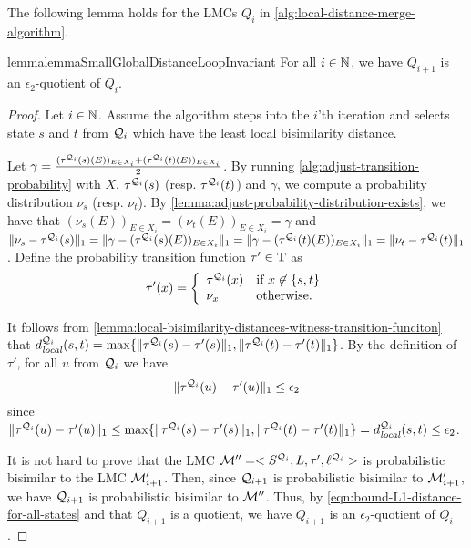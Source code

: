 The following lemma holds for the LMCs $Q_i$ in \cref{alg:local-distance-merge-algorithm}.
\begin{restatable}{lemma}{lemmaSmallGlobalDistanceLoopInvariant}\label{lemma:small-global-distance-loop}
	For all $i \in \mathbb{N}$, we have $Q_{i+1}$ is an $\epsilon_2$-quotient of $Q_{i}$.
\end{restatable}
\begin{proof}
	Let $i \in \mathbb{N}$. Assume the algorithm steps into the $i$'th iteration and selects state $s$ and $t$ from $\mathcal{Q}_i$ which have the least local bisimilarity distance. 
	
	Let $\gamma = \frac{(\tau^{\mathcal{Q}_i}(s)(E))_{E \in X_i} + (\tau^{\mathcal{Q}_i}(t)(E))_{E \in X_i}}{2}$. By running \cref{alg:adjust-transition-probability} with $X$, $\tau^{\mathcal{Q}_i}(s)$ (resp. $\tau^{\mathcal{Q}_i}(t)$) and $\gamma$, we compute a probability distribution $\nu_s$ (resp. $\nu_t$). By \cref{lemma:adjust-probability-distribution-exists}, we have that $(\nu_s(E))_{E \in X_i} = (\nu_t(E))_{E \in X_i}  = \gamma$ and $\|\nu_s - \tau^{\mathcal{Q}_i}(s)\|_1 = \|\gamma - (\tau^{\mathcal{Q}_i}(s)(E))_{E \in  X_i}\|_1 = \|\gamma - (\tau^{\mathcal{Q}_i}(t)(E))_{E \in  X_i}\|_1 = \|\nu_t - \tau^{\mathcal{Q}_i}(t)\|_1$. Define the probability transition function $\tau' \in {\rm T}$ as 	
	\[
	\tau'(x) = \left \{
	\begin{array}{ll}
	\tau^{\mathcal{Q}_i}(x)& \mbox{if $x \not\in \{s, t\}$}\\
	\nu_x & \mbox{otherwise.}
	\end{array}
	\right .
	\]
	
	It follows from \cref{lemma:local-bisimilarity-distances-witness-transition-funciton} that $d_{\mathit{local}}^{\mathcal{Q}_{i}} (s, t) = \max\{\|\tau^{\mathcal{Q}_{i}}(s) - \tau'(s) \|_1, \|\tau^{\mathcal{Q}_{i}}(t) - \tau'(t)\|_1\}$. By the definition of $\tau'$, for all $u$ from $\mathcal{Q}_{i}$ we have \begin{equation}\label{eqn:bound-L1-distance-for-all-states}
	\|\tau^{\mathcal{Q}_{i}}(u) - \tau'(u)\|_1 \le \epsilon_2
	\end{equation} 
	since $\|\tau^{\mathcal{Q}_{i}}(u) - \tau'(u)\|_1 \le \max\{\|\tau^{\mathcal{Q}_{i}}(s) - \tau'(s) \|_1, \|\tau^{\mathcal{Q}_{i}}(t) - \tau'(t)\|_1\} = d_{\mathit{local}}^{\mathcal{Q}_{i}} (s, t) \le \epsilon_2$.

	It is not hard to prove that the LMC $\mathcal{M}'' = <S^{\mathcal{Q}_i}, L, \tau', \ell^{\mathcal{Q}_{i}}>$ is probabilistic bisimilar to the LMC $\mathcal{M}_{i+1}'$. Then, since $\mathcal{Q}_{i+1}$ is probabilistic bisimilar to $\mathcal{M}_{i+1}'$, we have $\mathcal{Q}_{i+1}$ is probabilistic bisimilar to $\mathcal{M}''$. Thus, by \eqref{eqn:bound-L1-distance-for-all-states} and that $Q_{i+1}$ is a quotient, we have $Q_{i+1}$ is an $\epsilon_2$-quotient of $Q_i$.

\end{proof}

